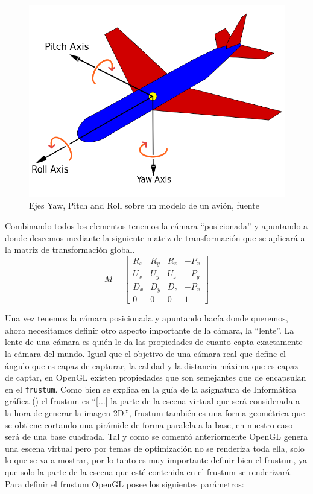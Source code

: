 \begin{figure} %
	\centering
	\includegraphics[scale=0.5]{imagenes/Yaw_Axis_Corrected.png} 
	\caption{ Ejes Yaw, Pitch and Roll sobre un modelo de un avión, fuente \cite{AircraftPrincipalAxes2018}} \label{fig:Yaw_Axis_Corrected.png}
\end{figure}

Combinando todos los elementos tenemos la cámara ``posicionada'' y apuntando a donde deseemos mediante la siguiente matriz de transformación que se aplicará a la matriz de transformación global. \\  
\[ 
	M=
	\begin{bmatrix}
		R_{x} & R_{y} & R_{z} & -P_{x}\\
		U_{x} & U_{y} & U_{z} & -P_{y}\\
		D_{x} & D_{y} & D_{z} & -P_{x}\\
		0 & 0 & 0 & 1 
	\end{bmatrix}
\]

Una vez tenemos la cámara posicionada y apuntando hacía donde queremos, ahora necesitamos definir otro aspecto importante de la cámara, la ``lente''. La lente de una cámara es quién le da las propiedades de cuanto capta exactamente la cámara del mundo. Igual que el objetivo de una cámara real que define el ángulo que es capaz de capturar, la calidad y la distancia máxima que es capaz de captar, en OpenGL existen propiedades que son semejantes que de encapsulan en el \texttt{frustum}. Como bien se explica en la guía de la asignatura de Informática gráfica (\cite{franciscojaviermelerorusGuiaAsignaturaInformatica2016}) el frustum es ``[...] la parte de la escena virtual que será considerada a la hora de generar la imagen 2D.'', frustum también es una forma geométrica que se obtiene cortando una pirámide de forma paralela a la base, en nuestro caso será de una base cuadrada.  Tal y como se comentó anteriormente OpenGL genera una escena virtual pero por temas de optimización no se renderiza toda ella, solo lo que se va a mostrar, por lo tanto es muy importante definir bien el frustum, ya que solo la parte de la escena que esté contenida en el frustum se renderizará. Para definir el frustum OpenGL posee los siguientes parámetros:

